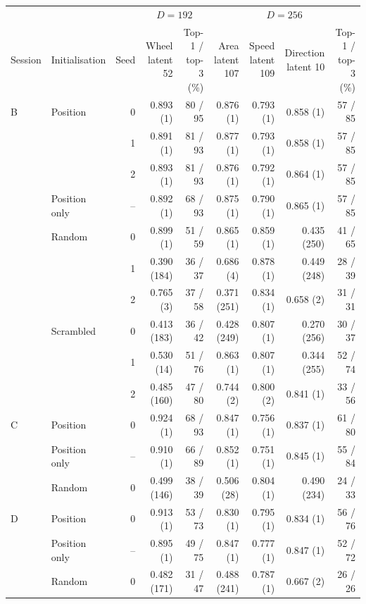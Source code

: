 \begin{tabular*}{\linewidth}{@{\extracolsep{\fill}}llrrrrrrr@{}}
\toprule
 & & & \multicolumn{2}{c}{$D=192$} & \multicolumn{4}{c}{$D=256$} \\
\cmidrule(lr){4-5}\cmidrule(lr){6-9}
Session & Initialisation & Seed & \shortstack{Wheel\\latent 52} & \shortstack{Top-1 / top-3\\(\%)} & \shortstack{Area\\latent 107} & \shortstack{Speed\\latent 109} & \shortstack{Direction\\latent 10} & \shortstack{Top-1 / top-3\\(\%)} \\
\midrule
B & Position & 0 & 0.893 (1) & 80 / 95 & 0.876 (1) & 0.793 (1) & 0.858 (1) & 57 / 85 \\
 &  & 1 & 0.891 (1) & 81 / 93 & 0.877 (1) & 0.793 (1) & 0.858 (1) & 57 / 85 \\
 &  & 2 & 0.893 (1) & 81 / 93 & 0.876 (1) & 0.792 (1) & 0.864 (1) & 57 / 85 \\
 & Position only & -- & 0.892 (1) & 68 / 93 & 0.875 (1) & 0.790 (1) & 0.865 (1) & 57 / 85 \\
 & Random & 0 & 0.899 (1) & 51 / 59 & 0.865 (1) & 0.859 (1) & 0.435 (250) & 41 / 65 \\
 &  & 1 & 0.390 (184) & 36 / 37 & 0.686 (4) & 0.878 (1) & 0.449 (248) & 28 / 39 \\
 &  & 2 & 0.765 (3) & 37 / 58 & 0.371 (251) & 0.834 (1) & 0.658 (2) & 31 / 31 \\
 & Scrambled & 0 & 0.413 (183) & 36 / 42 & 0.428 (249) & 0.807 (1) & 0.270 (256) & 30 / 37 \\
 &  & 1 & 0.530 (14) & 51 / 76 & 0.863 (1) & 0.807 (1) & 0.344 (255) & 52 / 74 \\
 &  & 2 & 0.485 (160) & 47 / 80 & 0.744 (2) & 0.800 (2) & 0.841 (1) & 33 / 56 \\
\midrule
C & Position & 0 & 0.924 (1) & 68 / 93 & 0.847 (1) & 0.756 (1) & 0.837 (1) & 61 / 80 \\
 & Position only & -- & 0.910 (1) & 66 / 89 & 0.852 (1) & 0.751 (1) & 0.845 (1) & 55 / 84 \\
 & Random & 0 & 0.499 (146) & 38 / 39 & 0.506 (28) & 0.804 (1) & 0.490 (234) & 24 / 33 \\
\midrule
D & Position & 0 & 0.913 (1) & 53 / 73 & 0.830 (1) & 0.795 (1) & 0.834 (1) & 56 / 76 \\
 & Position only & -- & 0.895 (1) & 49 / 75 & 0.847 (1) & 0.777 (1) & 0.847 (1) & 52 / 72 \\
 & Random & 0 & 0.482 (171) & 31 / 47 & 0.488 (241) & 0.787 (1) & 0.667 (2) & 26 / 26 \\
\bottomrule
\end{tabular*}
